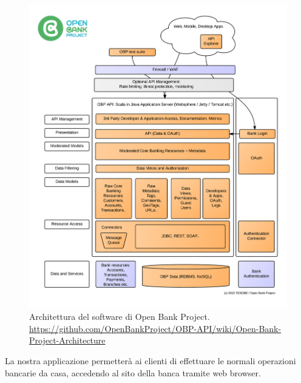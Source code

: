 \documentclass[]{softeng}
\begin{document}
\graphicspath{{Images/}}
\begin{figure}[tp]
	\centering
	\includegraphics[width=\textwidth]{open_bank_project_architecture}
	\caption{Architettura del software di Open Bank Project. \url{https://github.com/OpenBankProject/OBP-API/wiki/Open-Bank-Project-Architecture}}
	\label{fig:open_bank_project_architecture}
\end{figure}

La nostra applicazione permetter\`a ai clienti di effettuare le normali operazioni bancarie da casa, accedendo al sito della banca tramite web browser.
\end{document}
